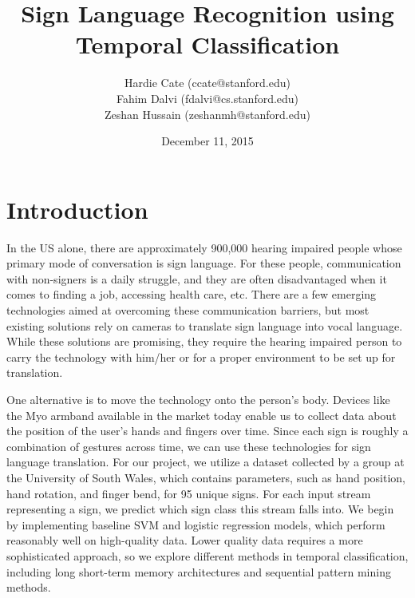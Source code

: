 \documentclass[twocolumn]{article}
\title{Sign Language Recognition using Temporal Classification}
\author{Hardie Cate (ccate@stanford.edu)\\ Fahim Dalvi (fdalvi@cs.stanford.edu) \\ Zeshan Hussain (zeshanmh@stanford.edu)}
\date{December 11, 2015}
\begin{document}
\maketitle

\section{Introduction}
In the US alone, there are approximately 900,000 hearing impaired people whose primary mode of conversation is sign language. 
For these people, communication with non-signers is a daily struggle, and they are often disadvantaged when it comes to finding a job, accessing health care, etc.
There are a few emerging technologies aimed at overcoming these communication barriers, but most existing solutions rely on cameras to translate sign language into vocal language.
While these solutions are promising, they require the hearing impaired person to carry the technology with him/her or for a proper environment to be set up for translation.

One alternative is to move the technology onto the person’s body.
Devices like the Myo armband available in the market today enable us to collect data about the position of the user's hands and fingers over time.
Since each sign is roughly a combination of gestures across time, we can use these technologies for sign language translation.
For our project, we utilize a dataset collected by a group at the University of South Wales, which contains parameters, such as hand position, hand rotation, and finger bend, for 95 unique signs.
For each input stream representing a sign, we predict which sign class this stream falls into.
We begin by implementing baseline SVM and logistic regression models, which perform reasonably well on high-quality data.
Lower quality data requires a more sophisticated approach, so we explore different methods in temporal classification, including long short-term memory architectures and sequential pattern mining methods. 
\end{document}
